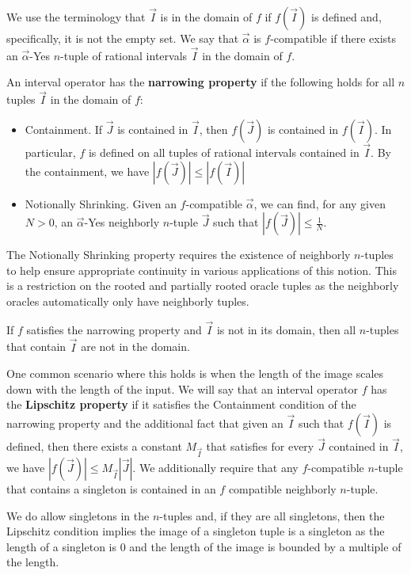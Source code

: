\documentclass[12pt]{article}
\begin{document}
We use the terminology that $\vec{I}$ is in the domain of $f$ if $f(\vec{I})$ is defined and, specifically, it is not the empty set. We say that $\vec{\alpha}$ is $f$-compatible if there exists an $\vec{\alpha}$-Yes $n$-tuple of rational intervals $\vec{I}$ in the domain of $f$. 

An interval operator has the \textbf{narrowing property} if the following holds for all $n$ tuples $\vec{I}$ in the domain of $f$:
\begin{itemize}
    \item Containment. If $\vec{J}$ is contained in $\vec{I}$, then $f(\vec{J})$ is contained in $f(\vec{I})$. In particular, $f$ is defined on all tuples of rational intervals contained in $\vec{I}$. By the containment, we have $|f(\vec{J})| \leq |f(\vec{I})|$
    \item Notionally Shrinking. Given an $f$-compatible $\vec{\alpha}$, we can find, for any given $N>0$, an $\vec{\alpha}$-Yes neighborly $n$-tuple $\vec{J}$  such that $|f(\vec{J})| \leq \frac{1}{N}$. 
\end{itemize}

The Notionally Shrinking property requires the existence of neighborly $n$-tuples to help ensure appropriate continuity in various applications of this notion. This is a restriction on the rooted and partially rooted oracle tuples as the neighborly oracles automatically only have neighborly tuples. 

If $f$ satisfies the narrowing property and $\vec{I}$ is not in its domain, then all $n$-tuples that contain $\vec{I}$ are not in the domain. 

One common scenario where this holds is when the length of the image scales down with the length of the input. We will say that an interval operator $f$ has the \textbf{Lipschitz property} if it satisfies the Containment condition of the narrowing property and the additional fact that given an $\vec{I}$ such that $f(\vec{I})$ is defined, then there exists a constant $M_{\vec{I}}$ that satisfies for every $\vec{J}$ contained in $\vec{I}$, we have $|f(\vec{J})| \leq M_{\vec{I}} |\vec{J}|$. We additionally require that any $f$-compatible $n$-tuple that contains a singleton is contained in an $f$  compatible neighborly $n$-tuple. 

We do allow singletons in the $n$-tuples and, if they are all singletons, then the Lipschitz condition implies the image of a singleton tuple is a singleton as the length of a singleton is 0 and the length of the image is bounded by a multiple of the length. 
\end{document}
